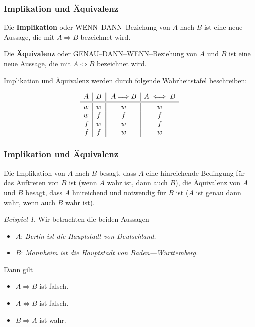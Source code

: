 \documentclass[hyperref={pdfpagelabels=false}]{beamer}
\theoremstyle{plain}%
\theoremstyle{definition}
\theoremstyle{remark}
\newtheorem*{beispiel}{Beispiel}
\begin{document}
\begin{frame}
\frametitle{Implikation und Äquivalenz}

Die \textbf{Implikation} oder WENN--DANN--Beziehung von $A$ nach $B$ ist eine neue Aussage, die mit 
$A \Longrightarrow B$ bezeichnet wird. 

\pause 

Die \textbf{Äquivalenz} oder GENAU--DANN--WENN--Beziehung von $A$ und $B$ ist eine neue Aussage, die mit 
$A \iff B$ bezeichnet wird. 

\pause 

Implikation und Äquivalenz werden durch folgende Wahrheitstafel beschreiben:

	$$ \begin{array}{ r | c || c | c}
	A & B & A \Longrightarrow B & A \iff B \\
	\hline \hline
	w & w &  w & w \\
	w & f &  f & f \\
	f & w &  w & f \\
	f & f &  w & w
	\end{array} $$

\end{frame}

\begin{frame}
\frametitle{Implikation und Äquivalenz}

Die Implikation von $A$ nach $B$ besagt, dass $A$ eine hinreichende Bedingung für das Auftreten von $B$ ist 
(wenn $A$ wahr ist, dann auch $B$), die Äquivalenz von $A$ und $B$ besagt, dass $A$ hnireichend und notwendig 
für $B$ ist ($A$ ist genau dann wahr, wenn auch $B$ wahr ist). 
\pause 

\begin{beispiel}
Wir betrachten die beiden Aussagen 
\begin{itemize}
\item $A$: \textit{Berlin ist die Hauptstadt von Deutschland.} 
\item $B$: \textit{Mannheim 
ist die Hauptstadt von Baden---Württemberg.}
\end{itemize} 
Dann gilt 
\begin{itemize}
\item<3-> $A \Longrightarrow B$ ist falsch. 
\item<4-> $A \iff B$ ist falsch. 
\item<5-> $B \Longrightarrow A$ ist wahr. 
\end{itemize}
\end{beispiel}

\end{frame}
\end{document}
